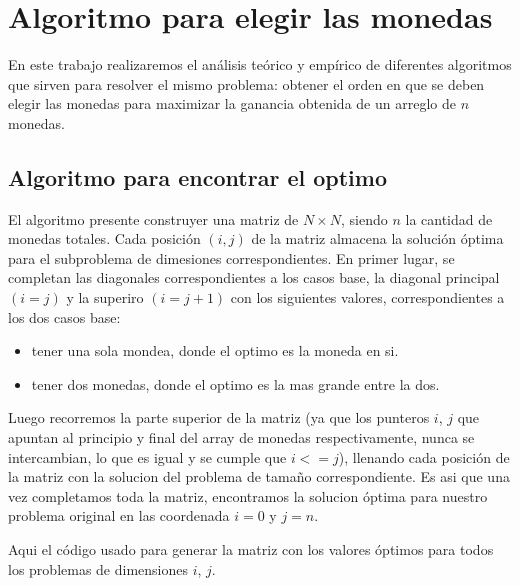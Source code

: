 \section{Algoritmo para elegir las monedas}

En este trabajo realizaremos el análisis teórico y empírico de diferentes algoritmos que sirven para resolver el mismo problema: obtener el orden en que se deben elegir las monedas para maximizar la ganancia obtenida de un arreglo de $n$ monedas. 

\subsection{Algoritmo para encontrar el optimo}

El algoritmo presente construyer una matriz de $N \times N$, siendo $n$ la cantidad de monedas totales. Cada posición $(i,j)$ de la matriz almacena la solución óptima para el subproblema de dimesiones correspondientes.
En primer lugar, se completan las diagonales correspondientes a los casos base, la diagonal principal $(i = j)$  y la superiro $(i = j + 1)$ con los siguientes valores, correspondientes a los dos casos base:

\begin{itemize}
    \item tener una sola mondea, donde el optimo es la moneda en si.
    \item tener dos monedas, donde el optimo es la mas grande entre la dos.
\end{itemize}
Luego recorremos la parte superior de la matriz (ya que los punteros $i$, $j$ que 
apuntan al principio y final del array de monedas respectivamente, nunca se
intercambian, lo que es igual y se cumple que $i <= j$), llenando cada posición de la matriz con la solucion del problema de tamaño correspondiente.
Es asi que una vez completamos toda la matriz, encontramos la solucion óptima para nuestro problema original en las coordenada $i = 0$ y $j = n$.

Aqui el código usado para generar la matriz con los valores óptimos para todos los problemas de dimensiones $i$, $j$.

